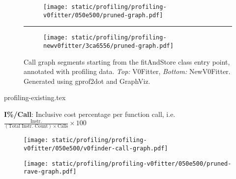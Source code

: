 \begin{figure}[h]
  \vspace{-20pt}
  \centering
  \begin{subfigure}{\linewidth}
    \centering
    \texttt{[image: static/profiling/profiling-v0fitter/050e500/pruned-graph.pdf]}
  \end{subfigure}

  \vspace{-25pt}

  {\color{gray}\rule{\linewidth}{0.5pt}}

  \vspace{-15pt}

  \begin{subfigure}{\linewidth}
    \centering
    \texttt{[image: static/profiling/profiling-newv0fitter/3ca6556/pruned-graph.pdf]}
  \end{subfigure}

  \vspace{-20pt}

  \caption{
    Call graph segments starting from the fitAndStore class entry point, annotated with profiling data. \emph{Top:} V0Fitter, \emph{Bottom:} NewV0Fitter. Generated using gprof2dot and GraphViz.
  }\label{fig:profiling-existing}
\end{figure}

\begin{table}[h]
  \centering
  {profiling-existing.tex}
  \caption*{
    \textbf{I\%/Call}: Inclusive cost percentage per function call, i.e.\ $\frac{\text{Instr.}}{(\text{Total Instr. Count}) \times \text{Calls}} \times 100$
  }
  \caption{%
    Profiling data for selected function calls, ordered by cost per call
  }\label{tab:profiling-existing}
\end{table}

\begin{figure}[h]
  \begin{minipage}[t]{0.5\textwidth}%
    \vspace{0pt}
    \texttt{[image: static/profiling/profiling-v0fitter/050e500/v0finder-call-graph.pdf]}
    \captionsetup{justification=raggedright,singlelinecheck=false}
     \label{fig:v0finder-callgraph}
     \label{fig:rave-callgraph}
  \end{minipage}%
  \hspace{-15pt}
  \begin{minipage}[t]{0.5\textwidth}%
    \vspace{0pt}
    \texttt{[image: static/profiling/profiling-v0fitter/050e500/pruned-rave-graph.pdf]}
  \end{minipage}
\end{figure}

